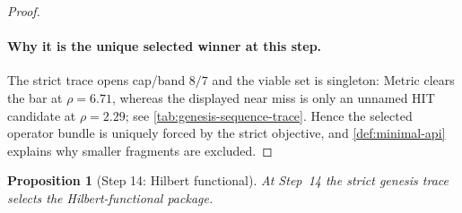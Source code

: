 \documentclass[11pt,a4paper]{article}
\theoremstyle{plain}
\newtheorem{proposition}[theorem]{Proposition}
\theoremstyle{definition}
\theoremstyle{remark}
\begin{document}
\begin{proof}
\paragraph{Why it is the unique selected winner at this step.}
The strict trace opens cap/band $8/7$ and the viable set is singleton:
Metric clears the bar at $\rho=6.71$, whereas the displayed near miss is only an
unnamed HIT candidate at $\rho=2.29$; see
\cref{tab:genesis-sequence-trace}.
Hence the selected operator bundle is uniquely forced by the strict objective, and
\cref{def:minimal-api} explains why smaller fragments are excluded.
\end{proof}

\begin{proposition}[Step 14: Hilbert functional]
\label{prop:genesis-step14}
At Step~14 the strict genesis trace selects the Hilbert-functional package.
\end{proposition}
\end{document}
